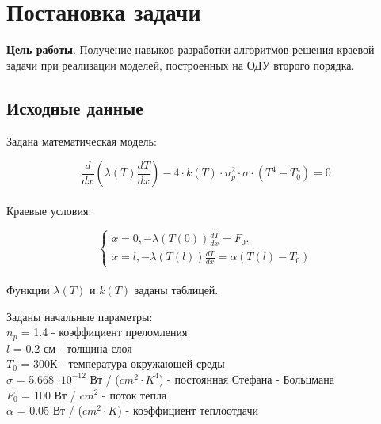 \documentclass[a4paper,oneside,12pt]{extreport}
\begin{document}


\section{Постановка задачи}
\textbf{Цель работы}. 
Получение навыков разработки алгоритмов решения краевой задачи при
реализации моделей, построенных на ОДУ второго порядка.

\subsection{Исходные данные}


Задана математическая модель:

\begin{equation*}
	\frac{d}{dx}(\lambda(T)\frac{dT}{dx}) - 4 \cdot k(T) \cdot n_{p}^2 \cdot \sigma \cdot (T^4 - T_{0}^4) = 0
\end{equation*}\\

Краевые условия:

\begin{equation*}
	\begin{cases} x = 0, -\lambda(T(0))\frac{dT}{dx} = F_{0}.
	\\ x = l, -\lambda(T(l))\frac{dT}{dx} = \alpha(T(l) - T_{0})
	\end{cases}
\end{equation*}\\

Функции $\lambda(T)$ и $k(T)$ заданы таблицей.\\

\begin{figure}[ht!]
\end{figure}

Заданы начальные параметры:\\
\indent $n_p$ = 1.4 - коэффициент преломления\\
\indent $l$ = 0.2 см - толщина слоя\\
\indent $T_{0}$ = 300К - температура окружающей среды\\
\indent $\sigma$ = 5.668 $\cdot 10^{-12}$ Вт / ($cm^2 \cdot K^4$) - постоянная Стефана - Больцмана\\
\indent $F_{0}$ = 100 Вт / $cm^2$ - поток тепла\\
\indent $\alpha$ = 0.05 Вт / ($cm^2 \cdot K$) - коэффициент теплоотдачи\\
\end{document}
